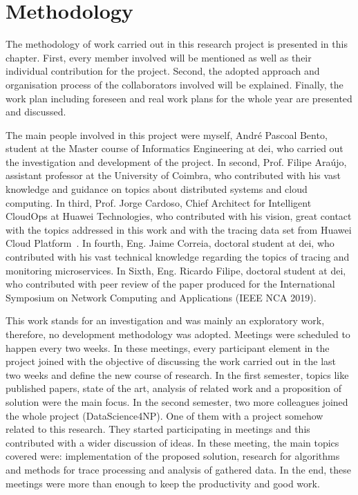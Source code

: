 \glsresetall
\chapter{Methodology}
\label{chap:methodology}

The methodology of work carried out in this research project is presented in this chapter. First, every member involved will be mentioned as well as their individual contribution for the project. Second, the adopted approach and organisation process of the collaborators involved will be explained. Finally, the work plan including foreseen and real work plans for the whole year are presented and discussed.

The main people involved in this project were myself, André Pascoal Bento, student at the Master course of Informatics Engineering at \gls{dei}, who carried out the investigation and development of the project. In second, Prof. Filipe Araújo, assistant professor at the University of Coimbra, who contributed with his vast knowledge and guidance on topics about distributed systems and cloud computing. In third, Prof. Jorge Cardoso, Chief Architect for Intelligent CloudOps at Huawei Technologies, who contributed with his vision, great contact with the topics addressed in this work and with the tracing data set from Huawei Cloud Platform~\cite{huawei_cloud_platform}. In fourth, Eng. Jaime Correia, doctoral student at \gls{dei}, who contributed with his vast technical knowledge regarding the topics of tracing and monitoring microservices. In Sixth, Eng. Ricardo Filipe, doctoral student at \gls{dei}, who contributed with peer review of the paper produced for the International Symposium on Network Computing and Applications (IEEE NCA 2019).

This work stands for an investigation and was mainly an exploratory work, therefore, no development methodology was adopted. Meetings were scheduled to happen every two weeks. In these meetings, every participant element in the project joined with the objective of discussing the work carried out in the last two weeks and define the new course of research. In the first semester, topics like published papers, state of the art, analysis of related work and a proposition of solution were the main focus. In the second semester, two more colleagues joined the whole project (DataScience4NP). One of them with a project somehow related to this research. They started participating in meetings and this contributed with a wider discussion of ideas. In these meeting, the main topics covered were: implementation of the proposed solution, research for algorithms and methods for trace processing and analysis of gathered data. In the end, these meetings were more than enough to keep the productivity and good work.

